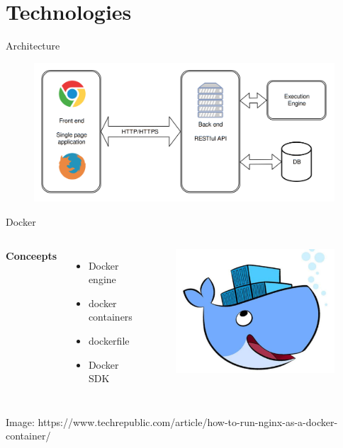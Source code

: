 \documentclass[aspectratio=169]{beamer}
\begin{document}
	\section{Technologies}
	\begin{frame}{Architecture}
		\begin{figure}
			\centering
			\includegraphics[width=0.8\linewidth]{images/arch}
		\end{figure}
	\end{frame}
	\begin{frame}{Docker}
	\begin{columns}
		\Large \textbf{Conceepts}
		\begin{itemize}
			\normalsize
			\item Docker engine
			\item docker containers
			\item dockerfile
			\item Docker SDK
		\end{itemize}
		\begin{figure}
			\centering
			\includegraphics[width=1.0\linewidth]{images/dockerwhalehero}
		\end{figure}
	\end{columns}
	\tiny Image: https://www.techrepublic.com/article/how-to-run-nginx-as-a-docker-container/
	\end{frame}
\end{document}
